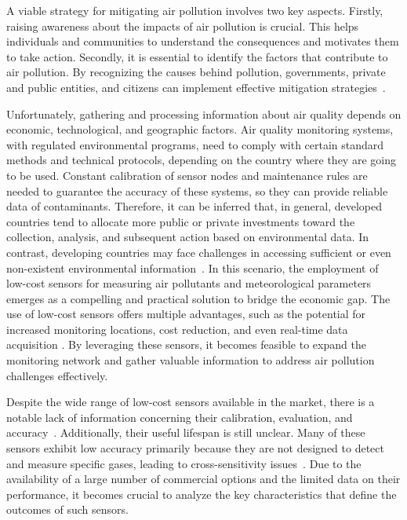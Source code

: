 \documentclass[10pt]{../imeko_acta}
\begin{document}
A viable strategy for mitigating air pollution involves two key aspects. Firstly, raising awareness about the impacts of air pollution is crucial. This helps individuals and communities to understand the consequences and motivates them to take action. Secondly, it is essential to identify the factors that contribute to air pollution. By recognizing the causes behind pollution, governments, private and public entities, and citizens can implement effective mitigation strategies~\cite{sofia}.

Unfortunately, gathering and processing information about air quality depends on economic, technological, and geographic factors. Air quality monitoring systems, with regulated environmental programs, need to comply with certain standard methods and technical protocols, depending on the country where they are going to be used. Constant calibration of sensor nodes and maintenance rules are needed to guarantee the accuracy of these systems, so they can provide reliable data of contaminants.
Therefore, it can be inferred that, in general, developed countries tend to allocate more public or private investments toward the collection, analysis, and subsequent action based on environmental data. In contrast, developing countries may face challenges in accessing sufficient or even non-existent environmental information~\cite{BALDASANO}.
In this scenario, the employment of low-cost sensors for measuring air pollutants and meteorological parameters emerges as a compelling and practical solution to bridge the economic gap. The use of low-cost sensors offers multiple advantages, such as the potential for increased monitoring locations, cost reduction, and even real-time data acquisition \cite{atmos10090506}. By leveraging these sensors, it becomes feasible to expand the monitoring network and gather valuable information to address air pollution challenges effectively.

Despite the wide range of low-cost sensors available in the market, there is a notable lack of information concerning their calibration, evaluation, and accuracy~\cite{LIU2020109438}. Additionally, their useful lifespan is still unclear. Many of these sensors exhibit low accuracy primarily because they are not designed to detect and measure specific gases, leading to cross-sensitivity issues~\cite{atmos10090506}. Due to the availability of a large number of commercial options and the limited data on their performance, it becomes crucial to analyze the key characteristics that define the outcomes of such sensors.
\end{document}
